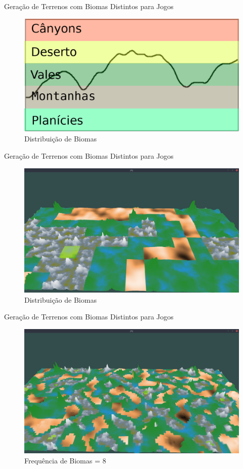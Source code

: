 \begin{frame}{Geração de Terrenos com Biomas Distintos para Jogos}
  \begin{figure}
		\centering
        \includegraphics[width=.8\textwidth]{img/uffs/biomesdistnoise.png}
        \caption{Distribuição de Biomas}
  \end{figure}
\end{frame}

\begin{frame}{Geração de Terrenos com Biomas Distintos para Jogos}
  \begin{figure}
		\centering
        \includegraphics[width=.8\textwidth]{img/uffs/256f4.png}
        \caption{Distribuição de Biomas}
  \end{figure}
\end{frame}

\begin{frame}{Geração de Terrenos com Biomas Distintos para Jogos}
  \begin{figure}
		\centering
        \includegraphics[width=.8\textwidth]{img/uffs/8b32.png}
        \caption{Frequência de Biomas = 8}
  \end{figure}
\end{frame}

